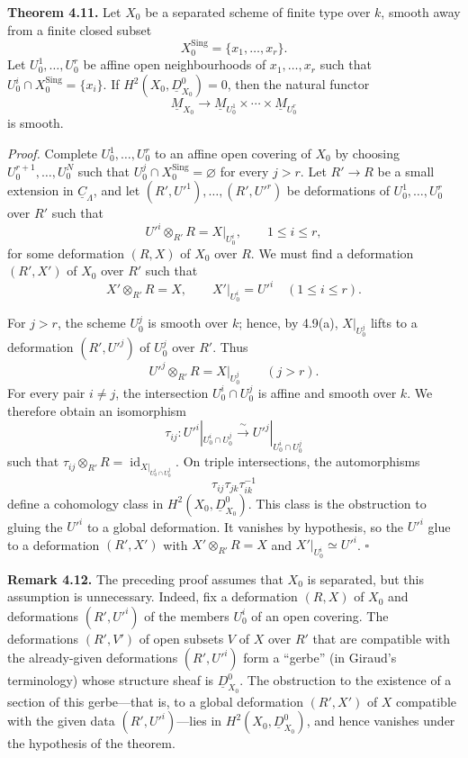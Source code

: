 
\medskip
\noindent\textbf{Theorem 4.11.}
Let $X_0$ be a separated scheme of finite type over $k$, smooth away
from a finite closed subset
\[
X_0^{\mathrm{Sing}}=\{x_1,\ldots,x_r\}.
\]
Let $U_0^1,\ldots,U_0^r$ be affine open neighbourhoods of
$x_1,\ldots,x_r$ such that
$U_0^i\cap X_0^{\mathrm{Sing}}=\{x_i\}$. If
$H^2(X_0,\underline D^0_{X_0})=0$, then the natural functor
\[
\underline M_{X_0}\longrightarrow
\underline M_{U_0^1}\times\cdots\times\underline M_{U_0^r}
\]
is smooth.

\smallskip
\noindent\textit{Proof.}
Complete $U_0^1,\ldots,U_0^r$ to an affine open covering of $X_0$
by choosing $U_0^{r+1},\ldots,U_0^N$ such that
$U_0^j\cap X_0^{\mathrm{Sing}}=\varnothing$ for every $j>r$.
Let $R'\longrightarrow R$ be a small extension in
$\underline C_\Lambda$, and let
$(R',U'^1),\ldots,(R',U'^r)$ be deformations of
$U_0^1,\ldots,U_0^r$ over $R'$ such that
\[
U'^i\otimes_{R'}R=X|_{U_0^i},\qquad 1\leq i\leq r,
\]
for some deformation $(R,X)$ of $X_0$ over $R$. We must find a
deformation $(R',X')$ of $X_0$ over $R'$ such that
\[
X'\otimes_{R'}R=X,
\qquad
X'|_{U_0^i}=U'^i\quad(1\leq i\leq r).
\]


For $j>r$, the scheme $U_0^j$ is smooth over $k$; hence, by 4.9(a),
$X|_{U_0^j}$ lifts to a deformation $(R',U'^j)$ of $U_0^j$ over
$R'$. Thus
\[
U'^j\otimes_{R'}R=X|_{U_0^j}\qquad(j>r).
\]
For every pair $i\neq j$, the intersection $U_0^i\cap U_0^j$ is
affine and smooth over $k$. We therefore obtain an isomorphism
\[
\tau_{ij}:U'^i|_{U_0^i\cap U_0^j}
\xrightarrow{\ \sim\ }
U'^j|_{U_0^i\cap U_0^j}
\]
such that
$\tau_{ij}\otimes_{R'}R=\operatorname{id}_{X|_{U_0^i\cap U_0^j}}$.
On triple intersections, the automorphisms
\[
\tau_{ij}\tau_{jk}\tau_{ik}^{-1}
\]
define a cohomology class in
$H^2(X_0,\underline D^0_{X_0})$. This class is the obstruction to
gluing the $U'^i$ to a global deformation. It vanishes by hypothesis,
so the $U'^i$ glue to a deformation $(R',X')$ with
$X'\otimes_{R'}R=X$ and $X'|_{U_0^i}\simeq U'^i$. \hfill$\square$

\medskip
\noindent\textbf{Remark 4.12.}
The preceding proof assumes that $X_0$ is separated, but this
assumption is unnecessary. Indeed, fix a deformation $(R,X)$ of
$X_0$ and deformations $(R',U'^i)$ of the members $U_0^i$ of an open
covering. The deformations $(R',V')$ of open subsets $V$ of $X$ over
$R'$ that are compatible with the already-given deformations
$(R',U'^i)$ form a ``gerbe'' (in Giraud's terminology) whose
structure sheaf is $\underline D^0_{X_0}$. The obstruction to the
existence of a section of this gerbe---that is, to a global
deformation $(R',X')$ of $X$ compatible with the given data
$(R',U'^i)$---lies in $H^2(X_0,\underline D^0_{X_0})$, and hence
vanishes under the hypothesis of the theorem.

